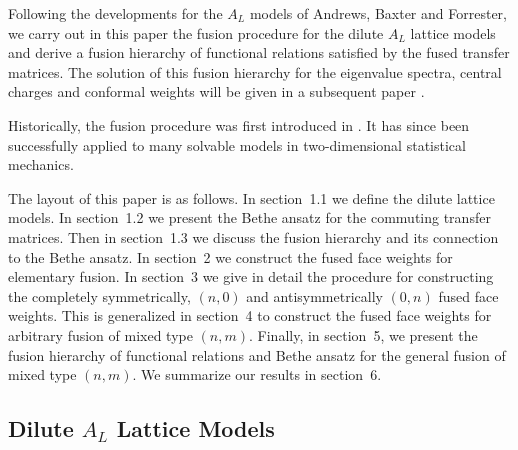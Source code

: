 Following the developments for the $A_L$ models of Andrews, Baxter and
Forrester, we carry out in this paper the fusion procedure for the dilute
$A_L$ lattice models and derive a fusion hierarchy of functional
relations satisfied by the fused transfer matrices. The solution of this
fusion hierarchy for the eigenvalue spectra, central charges and conformal
weights will be given in a subsequent paper \cite{ZhPe:95}.

Historically, the fusion procedure was first introduced in \cite{KRS:81}.
It has since been successfully applied
\cite{Cherednik:82,DJMO:86,JKMO:88b,ZhHo:89,ZhPe:94,Zhou:94} to many solvable
models in two-dimensional statistical mechanics.

The layout of this paper is as follows. In section~1.1 we define
the dilute lattice models. In section~1.2 we present the Bethe ansatz
for the commuting transfer matrices. Then in section~1.3 we discuss
the fusion hierarchy and its connection to the Bethe ansatz.
In section~2 we construct the fused face weights for elementary fusion.
In section~3 we give in detail the procedure for constructing
the completely symmetrically, $(n,0)$ and antisymmetrically $(0,n)$
fused face weights. This is generalized in section~4 to construct the
fused face weights for arbitrary fusion of mixed type $(n,m)$.
Finally, in section~5, we present the fusion hierarchy of functional
relations and Bethe ansatz for the general fusion of mixed type $(n,m)$.
We summarize our results in section~6.

\subsection{Dilute \mbox{\protect\boldmath $A_L$} Lattice Models}

